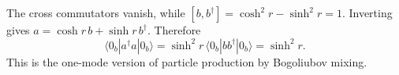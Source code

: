 \begin{enumerate}[leftmargin=2.8em,itemsep=1.2em]
The cross commutators vanish, while
\([b,b^\dagger]=\cosh^2r-\sinh^2r=1\).  Inverting gives
\(a=\cosh r\,b+\sinh r\,b^\dagger\).  Therefore
\[
 \langle0_b|a^\dagger a|0_b\rangle
 =\sinh^2r\,\langle0_b|bb^\dagger|0_b\rangle
 =\sinh^2r.
\]
This is the one-mode version of particle production by Bogoliubov mixing.
\end{enumerate}
